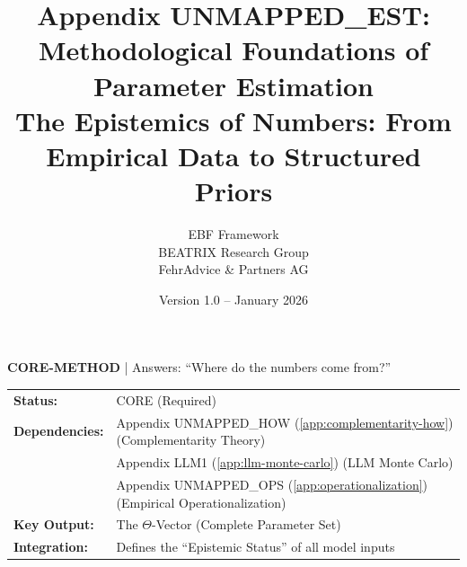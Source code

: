 \documentclass[11pt,a4paper]{article}
\title{Appendix UNMAPPED_EST: Methodological Foundations of Parameter Estimation\\
\large The Epistemics of Numbers: From Empirical Data to Structured Priors}
\author{EBF Framework\\BEATRIX Research Group\\FehrAdvice \& Partners AG}
\date{Version 1.0 -- January 2026}
\theoremstyle{definition}
\begin{document}
\maketitle

\begin{tcolorbox}[colback=blue!5!white, colframe=blue!75!black, title=Methodology Appendix]
\textbf{CORE-METHOD} | Answers: ``Where do the numbers come from?''

\begin{tabular}{ll}
\textbf{Status:} & CORE (Required) \\
\textbf{Dependencies:} & Appendix UNMAPPED_HOW (\ref{app:complementarity-how}) (Complementarity Theory) \\
 & Appendix LLM1 (\ref{app:llm-monte-carlo}) (LLM Monte Carlo) \\
 & Appendix UNMAPPED_OPS (\ref{app:operationalization}) (Empirical Operationalization) \\
\textbf{Key Output:} & The $\Theta$-Vector (Complete Parameter Set) \\
\textbf{Integration:} & Defines the ``Epistemic Status'' of all model inputs \\
\end{tabular}
\end{tcolorbox}

\tableofcontents
\newpage



%
%
%


\end{document}
